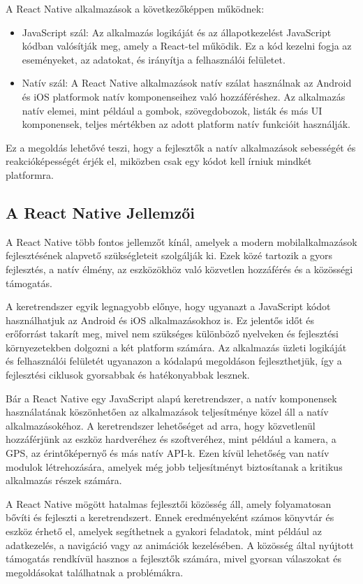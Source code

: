 \documentclass[
]{thesis-ekf}
\theoremstyle{definition}
\theoremstyle{remark}
\begin{document}
A React Native alkalmazások a következőképpen működnek:
\begin{itemize}
	\item JavaScript szál: Az alkalmazás logikáját és az állapotkezelést JavaScript kódban valósítják meg, amely a React-tel működik. Ez a kód kezelni fogja az eseményeket, az adatokat, és irányítja a felhasználói felületet.
	\item Natív szál: A React Native alkalmazások natív szálat használnak az Android és iOS platformok natív komponenseihez való hozzáféréshez. Az alkalmazás natív elemei, mint például a gombok, szövegdobozok, listák és más UI komponensek, teljes mértékben az adott platform natív funkcióit használják.
\end{itemize}

Ez a megoldás lehetővé teszi, hogy a fejlesztők a natív alkalmazások sebességét és reakcióképességét érjék el, miközben csak egy kódot kell írniuk mindkét platformra.

\subsection{A React Native Jellemzői}

A React Native több fontos jellemzőt kínál, amelyek a modern mobilalkalmazások fejlesztésének alapvető szükségleteit szolgálják ki. Ezek közé tartozik a gyors fejlesztés, a natív élmény, az eszközökhöz való közvetlen hozzáférés és a közösségi támogatás.

A keretrendszer egyik legnagyobb előnye, hogy ugyanazt a JavaScript kódot használhatjuk az Android és iOS alkalmazásokhoz is. Ez jelentős időt és erőforrást takarít meg, mivel nem szükséges különböző nyelveken és fejlesztési környezetekben dolgozni a két platform számára. Az alkalmazás üzleti logikáját és felhasználói felületét ugyanazon a kódalapú megoldáson fejleszthetjük, így a fejlesztési ciklusok gyorsabbak és hatékonyabbak lesznek.

Bár a React Native egy JavaScript alapú keretrendszer, a natív komponensek használatának köszönhetően az alkalmazások teljesítménye közel áll a natív alkalmazásokéhoz. A keretrendszer lehetőséget ad arra, hogy közvetlenül hozzáférjünk az eszköz hardveréhez és szoftveréhez, mint például a kamera, a GPS, az érintőképernyő és más natív API-k. Ezen kívül lehetőség van natív modulok létrehozására, amelyek még jobb teljesítményt biztosítanak a kritikus alkalmazás részek számára.

A React Native mögött hatalmas fejlesztői közösség áll, amely folyamatosan bővíti és fejleszti a keretrendszert. Ennek eredményeként számos könyvtár és eszköz érhető el, amelyek segíthetnek a gyakori feladatok, mint például az adatkezelés, a navigáció vagy az animációk kezelésében. A közösség által nyújtott támogatás rendkívül hasznos a fejlesztők számára, mivel gyorsan válaszokat és megoldásokat találhatnak a problémákra.
\end{document}
